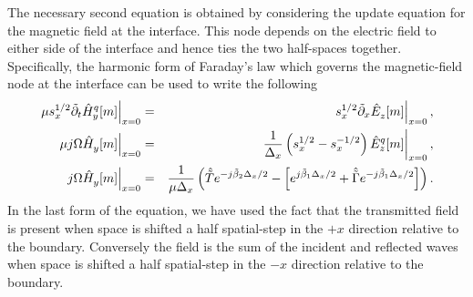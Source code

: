 The necessary second equation is obtained by considering the update
equation for the magnetic field at the interface.  This node depends
on the electric field to either side of the interface and hence ties
the two half-spaces together.  Specifically, the harmonic form of
Faraday's law which governs the magnetic-field node at the interface
can be used to write the following
\begin{eqnarray}
  \left.\mu s_x^{1/2}\tpartial_t\fdtd{\hat{H}_y}{m}{q}\right|_{x=0} &=&
  \left.s_x^{1/2}\tpartial_x\fdtd{\hat{E}_z}{m}{}\right|_{x=0},
  \\
  \left.\mu j\Omega\fdtd{\hat{H}_y}{m}{}\right|_{x=0} &=&
  \left.\frac{1}{\Delx}\left(s_x^{1/2} - s_x^{-1/2}\right)
     \fdtd{\hat{E}_z}{m}{q}\right|_{x=0},
  \\
  \left.j\Omega \fdtd{\hat{H}_y}{m}{}\right|_{x=0} &=&
  \frac{1}{\mu\Delx}
     \left(\Tfdtd e^{-j\tbeta_2\Delx/2} - 
           \left[e^{j\tbeta_1\Delx/2} + \Gfdtd e^{-j\tbeta_1\Delx/2}\right]\right).
  \label{eq:interfaceEqII}
\end{eqnarray}
In the last form of the equation, we have used the fact that the
transmitted field is present when space is shifted a half spatial-step
in the $+x$ direction relative to the boundary.  Conversely the field
is the sum of the incident and reflected waves when space is shifted a
half spatial-step in the $-x$ direction relative to the boundary.

